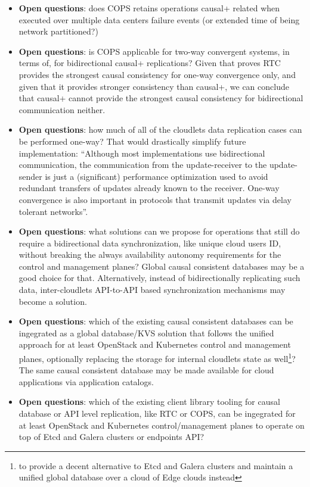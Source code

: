 \documentclass[conference]{IEEEtran}
\begin{document}
\begin{itemize}
  \item \textbf{Open questions}: does COPS retains operations causal+ related
    when executed over multiple data centers failure events (or extended time
    of being network partitioned?)

  \item \textbf{Open questions}: is COPS applicable for two-way convergent
    systems, in terms of\cite{b2}, for bidirectional causal+ replications?
    Given that\cite{b1} proves RTC provides the strongest causal consistency
    for one-way convergence only, and given that it provides stronger
    consistency than causal+, we can conclude that causal+ cannot provide the
    strongest causal consistency for bidirectional communication neither.

  \item \textbf{Open questions}: how much of all of the cloudlets data
    replication cases can be performed one-way? That would drastically simplify
    future implementation: ``Although most implementations use bidirectional
    communication, the communication from the update-receiver to the
    update-sender is just a (significant) performance optimization used to
    avoid redundant transfers of updates already known to the receiver. One-way
    convergence is also important in protocols that transmit updates via delay
    tolerant networks''\cite{b2}.

  \item \textbf{Open questions}: what solutions can we propose for operations
    that still do require a bidirectional data synchronization, like unique
    cloud users ID, without breaking the always availability autonomy
    requirements for the control and management planes? Global causal
    consistent databases may be a good choice for that. Alternatively, instead
    of bidirectionally replicating such data, inter-cloudlets API-to-API based
    synchronization mechanisms may become a solution.

  \item \textbf{Open questions}: which of the existing causal consistent
    databases\cite{b6} can be ingegrated as a global database/KVS solution that
    follows the unified approach for at least OpenStack and Kubernetes control
    and management planes, optionally replacing the storage for internal cloudlets
    state as well\footnote{to provide a decent alternative to Etcd and Galera clusters
    and maintain a unified global database over a cloud of Edge clouds
    instead}? The same causal consistent database may be made available for
    cloud applications via application catalogs.

  \item \textbf{Open questions}: which of the existing client library tooling
    for causal database or API level replication, like RTC or COPS, can be
    ingegrated for at least OpenStack and Kubernetes control/management planes
    to operate on top of Etcd and Galera clusters or endpoints API?
\end{itemize}
\end{document}

